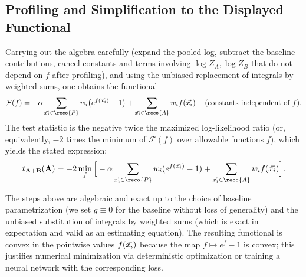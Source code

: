\documentclass[../../ddppaper2.tex]{subfiles}
\begin{document}
\subsection{Profiling and Simplification to the Displayed Functional}
Carrying out the algebra carefully (expand the pooled log, subtract the baseline contributions, cancel constants and terms involving \(\log Z_A,\log Z_B\) that do not depend on \(f\) after profiling), and using the unbiased replacement of integrals by weighted sums, one obtains the functional
\[
\mathcal{F}(f) = -\alpha \sum_{\event\in\reco{P}} w_i\big(e^{f(\event)}-1\big) + \sum_{\event\in\reco{A}} w_i f(\event) + \text{(constants independent of $f$)}.
\]
The test statistic is the negative twice the maximized log-likelihood ratio (or, equivalently, \(-2\) times the minimum of \(\mathcal{F}(f)\) over allowable functions \(f\)), which yields the stated expression:
\[
t_{\dataset{A}+\dataset{B}}(\dataset{A}) = -2 \min_f \Big[ -\alpha \sum_{\event\in\reco{P}} w_i (e^{f(\event)}-1) + \sum_{\event\in\reco{A}} w_i f(\event) \Big].
\]

\begin{remark}
    \textup{The steps above are algebraic and exact up to the choice of baseline parametrization (we set \(g\equiv 0\) for the baseline without loss of generality) and the unbiased substitution of integrals by weighted sums (which is exact in expectation and valid as an estimating equation). The resulting functional is convex in the pointwise values \(f({\vec{{x}_i}})\) because the map \(f\mapsto e^{f}-1\) is convex; this justifies numerical minimization via deterministic optimization or training a neural network with the corresponding loss.}
\end{remark}
\end{document}
